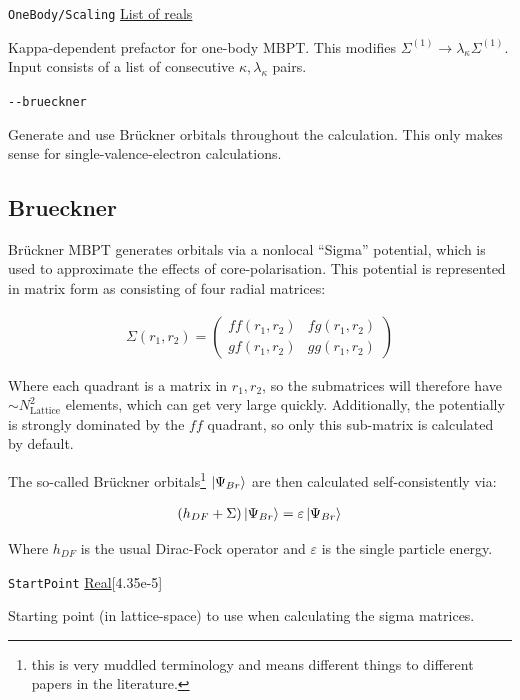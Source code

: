 \documentclass{report}
\begin{document}
\texttt{OneBody/Scaling} \uline{List of reals}
\begin{adjustwidth}{1cm}{}
Kappa-dependent prefactor for one-body MBPT. This modifies $\Sigma^{(1)} \to \lambda_{\kappa}
\Sigma^{(1)}$. Input consists of a list of consecutive $\kappa, \lambda_{\kappa}$ pairs.
\end{adjustwidth}

\texttt{{-}{-}brueckner}
\begin{adjustwidth}{1cm}{}
Generate and use Br\"{u}ckner orbitals throughout the calculation. This only makes sense for
single-valence-electron calculations.
\end{adjustwidth}

\subsection{Brueckner}

Br\"{u}ckner MBPT generates orbitals via a nonlocal ``Sigma'' potential, which is used to approximate
the effects of core-polarisation. This potential is represented in matrix 
form as consisting of four radial matrices:

\begin{align}
\Sigma(r_1, r_2) = 
\begin{pmatrix}
ff(r_1, r_2)    & fg(r_1, r_2)\\
gf(r_1, r_2)    & gg(r_1, r_2)
\end{pmatrix}
\end{align}

Where each quadrant is a matrix in $r_1, r_2$, so the submatrices will therefore have $\sim
N_{\mathrm{Lattice}}^2$ elements, which can get very large quickly. Additionally, the potentially is
strongly dominated by the $ff$ quadrant, so only this sub-matrix is calculated by default.

The so-called Br\"{u}ckner orbitals\footnote{this is very muddled terminology and 
means different things to different papers in the literature. } $\ket{\Psi_{Br}}$ are then calculated 
self-consistently via:

\begin{align}
\label{eq:brueckner}
(h_{DF} + \Sigma) \ket{\Psi_{Br}} = \varepsilon \ket{\Psi_{Br}}
\end{align}

Where $h_{DF}$ is the usual Dirac-Fock operator and $\varepsilon$ is the single particle energy.

\texttt{StartPoint} \uline{Real}[4.35e-5]
\begin{adjustwidth}{1cm}{}
Starting point (in lattice-space) to use when calculating the sigma matrices.
\end{adjustwidth}
\end{document}

